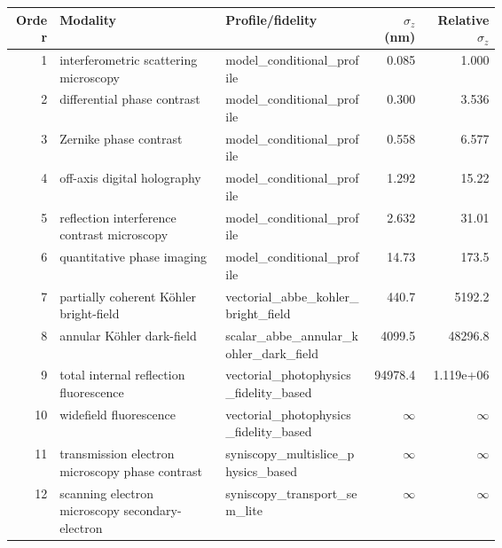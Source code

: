 \begin{tabular}{r p{0.34\linewidth} p{0.30\linewidth} r r}
\toprule
Order & Modality & Profile/fidelity & $\sigma_z$ (nm) & Relative $\sigma_z$ \\
\midrule
1 & interfero\allowbreak{}metric scattering microscopy & model\_conditional\_profile & 0.085 & 1.000 \\
2 & differential phase contrast & model\_conditional\_profile & 0.300 & 3.536 \\
3 & Zernike phase contrast & model\_conditional\_profile & 0.558 & 6.577 \\
4 & off-axis digital holography & model\_conditional\_profile & 1.292 & 15.22 \\
5 & reflection interference contrast microscopy & model\_conditional\_profile & 2.632 & 31.01 \\
6 & quantitative phase imaging & model\_conditional\_profile & 14.73 & 173.5 \\
7 & partially coherent Köhler bright-field & vectorial\_abbe\_kohler\_bright\_field & 440.7 & 5192.2 \\
8 & annular Köhler dark-field & scalar\_abbe\_annular\_kohler\_dark\_field & 4099.5 & 48296.8 \\
9 & total internal reflection fluorescence & vectorial\_photophysics\_fidelity\_based & 94978.4 & 1.119e+06 \\
10 & widefield fluorescence & vectorial\_photophysics\_fidelity\_based & $\infty$ & $\infty$ \\
11 & transmission electron microscopy phase contrast & syniscopy\_multislice\_physics\_based & $\infty$ & $\infty$ \\
12 & scanning electron microscopy secondary-electron & syniscopy\_transport\_sem\_lite & $\infty$ & $\infty$ \\
\bottomrule
\end{tabular}
